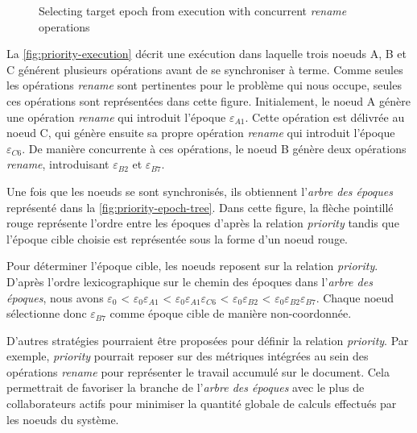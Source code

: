 \documentclass[12pt]{thesul}
\newcommand{\epoch}[1]{$\varepsilon_{#1}$}
\begin{document}
\begin{figure}[!ht]
{\begin{minipage}{\linewidth}
          \label{fig:priority-epoch-tree}
      \end{minipage}}
  \caption{Selecting target epoch from execution with concurrent \emph{rename} operations}
  \label{fig:priority-example}
\end{figure}

La \autoref{fig:priority-execution} décrit une exécution dans laquelle trois noeuds A, B et C générent plusieurs opérations avant de se synchroniser à terme.
Comme seules les opérations \emph{rename} sont pertinentes pour le problème qui nous occupe, seules ces opérations sont représentées dans cette figure.
Initialement, le noeud A génère une opération \emph{rename} qui introduit l'époque \epoch{A1}.
Cette opération est délivrée au noeud C, qui génère ensuite sa propre opération \emph{rename} qui introduit l'époque \epoch{C6}.
De manière concurrente à ces opérations, le noeud B génère deux opérations \emph{rename}, introduisant \epoch{B2} et \epoch{B7}.

Une fois que les noeuds se sont synchronisés, ils obtiennent l'\emph{arbre des époques} représenté dans la \autoref{fig:priority-epoch-tree}.
Dans cette figure, la flèche pointillé rouge représente l'ordre entre les époques d'après la relation \emph{priority} tandis que l'époque cible choisie est représentée sous la forme d'un noeud rouge.

Pour déterminer l'époque cible, les noeuds reposent sur la relation \emph{priority}.
D'après l'ordre lexicographique sur le chemin des époques dans l'\emph{arbre des époques}, nous avons \epoch{0} < \epoch{0}\epoch{A1} < \epoch{0}\epoch{A1}\epoch{C6} < \epoch{0}\epoch{B2} < \epoch{0}\epoch{B2}\epoch{B7}.
Chaque noeud sélectionne donc \epoch{B7} comme époque cible de manière non-coordonnée.

D'autres stratégies pourraient être proposées pour définir la relation \emph{priority}.
Par exemple, \emph{priority} pourrait reposer sur des métriques intégrées au sein des opérations \emph{rename} pour représenter le travail accumulé sur le document.
Cela permettrait de favoriser la branche de l'\emph{arbre des époques} avec le plus de collaborateurs actifs pour minimiser la quantité globale de calculs effectués par les noeuds du système.
\end{document}

